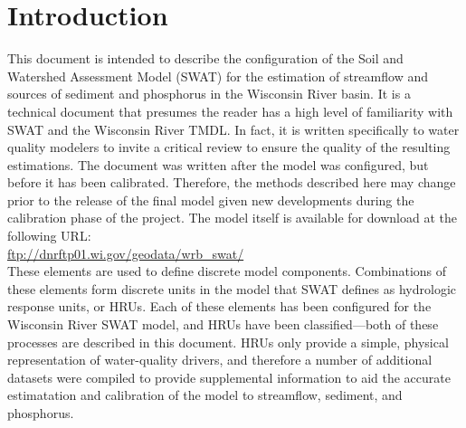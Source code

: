 \section{Introduction}
This document is intended to describe the configuration of the Soil and
Watershed Assessment Model (SWAT) for the estimation of streamflow and sources
of sediment and phosphorus in the Wisconsin River basin. It is a technical
document that presumes the reader has a high level of familiarity with SWAT and
the Wisconsin River TMDL. In fact, it is written specifically to water quality
modelers to invite a critical review to ensure the quality of the resulting
estimations. The document was written after the model was configured, but before
it has been calibrated. Therefore, the methods described here may change prior
to the release of the final model given new developments during the calibration
phase of the project. The model itself is available for download at the following URL: \\

\url{ftp://dnrftp01.wi.gov/geodata/wrb_swat/} \\



These elements are used to define discrete model components. Combinations of
these elements form discrete units in the model that SWAT defines as hydrologic
response units, or HRUs. Each of these elements has been configured for the
Wisconsin River SWAT model, and HRUs have been classified---both of these
processes are described in this document. HRUs only provide a simple, physical
representation of water-quality drivers, and therefore a number of additional
datasets were compiled to provide supplemental information to aid the accurate estimatation
and calibration of the model to streamflow, sediment, and phosphorus.

